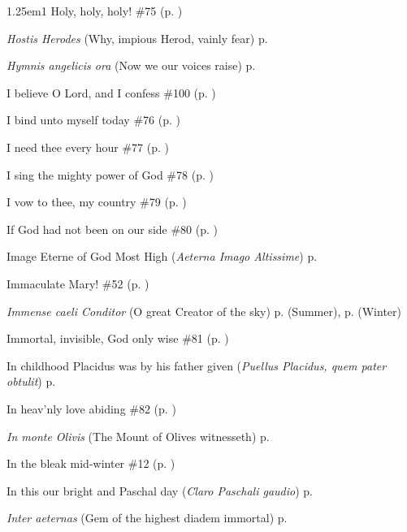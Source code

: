 \begin{hangparas}{1.25em}{1}
Holy, holy, holy!  \dotfill \#75 (p. \pageref{Hymn75})
\par\noindent
\textit{Hostis Herodes} (Why, impious Herod, vainly fear) \dotfill p. \pageref{EpiphanyEvensongHymn}
\par\noindent
\textit{Hymnis angelicis ora} (Now we our voices raise) \dotfill p. \pageref{ScholasticaInvitatory}
\par\noindent
I believe O Lord, and I confess \dotfill \#100 (p. \pageref{Hymn100})
\par\noindent
I bind unto myself today \dotfill \#76 (p. \pageref{Hymn76})
\par\noindent
I need thee every hour \dotfill \#77 (p. \pageref{Hymn77})
\par\noindent
I sing the mighty power of God \dotfill \#78 (p. \pageref{Hymn78})
\par\noindent
I vow to thee, my country \dotfill \#79 (p. \pageref{Hymn79})
\par\noindent
If God had not been on our side \dotfill \#80 (p. \pageref{Hymn80})
\par\noindent
Image Eterne of God Most High (\textit{Aeterna Imago Altissime}) \dotfill p. \pageref{ChristTheKingInvitatory}
\par\noindent
Immaculate Mary! \dotfill \#52 (p. \pageref{Hymn52})
\par\noindent
\textit{Immense caeli Conditor} (O great Creator of the sky) \dotfill p. \pageref{MondayEvensongSummer} (Summer), p. \pageref{MondayEvensongWinter} (Winter)
\par\noindent
Immortal, invisible, God only wise \dotfill \#81 (p. \pageref{Hymn81})
\par\noindent
In childhood Placidus was by his father given (\textit{Puellus Placidus, quem pater obtulit}) \dotfill p. \pageref{MaurusInvitatory}
\par\noindent
In heav'nly love abiding \dotfill \#82 (p. \pageref{Hymn82})
\par\noindent
\textit{In monte Olivis} (The Mount of Olives witnesseth) \dotfill p. \pageref{HolyRosaryInvitatory}
\par\noindent
In the bleak mid-winter \dotfill \#12 (p. \pageref{Hymn12})
\par\noindent
In this our bright and Paschal day (\textit{Claro Paschali gaudio}) \dotfill p. \pageref{ApostlesMattinsEaster}
\par\noindent
\textit{Inter aeternas} (Gem of the highest diadem immortal) \dotfill p. \pageref{BenedictMattins}
\par\noindent

\end{hangparas}
